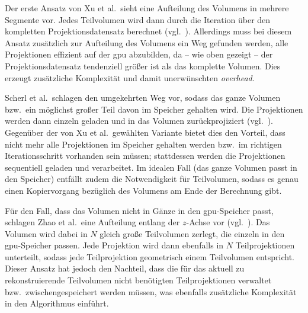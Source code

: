 Der erste Ansatz von Xu et al.\ sieht eine Aufteilung des Volumens in mehrere Segmente vor. Jedes Teilvolumen wird dann
durch die Iteration über den kompletten Projektionsdatensatz berechnet (vgl.~\cite{xumuell}). Allerdings muss bei diesem
Ansatz zusätzlich zur Aufteilung des Volumens ein Weg gefunden werden, alle Projektionen effizient auf der \gls{gpu}
abzubilden, da -- wie oben gezeigt -- der Projektionsdatensatz tendenziell größer ist als das komplette Volumen. Dies
erzeugt zusätzliche Komplexität und damit unerwünschten \textit{overhead}.

Scherl et al.\ schlagen den umgekehrten Weg vor, sodass das ganze Volumen bzw.\ ein möglichst großer Teil davon im
Speicher gehalten wird. Die Projektionen werden dann einzeln geladen und in das Volumen zurückprojiziert
(vgl.~\cite{scherlkeck}). Gegenüber der von Xu et al.\ gewählten Variante bietet dies den Vorteil, dass nicht mehr alle
Projektionen im Speicher gehalten werden bzw.\ im richtigen Iterationsschritt vorhanden sein müssen; stattdessen werden
die Projektionen sequentiell geladen und verarbeitet. Im idealen Fall (das ganze Volumen passt in den Speicher) entfällt
zudem die Notwendigkeit für Teilvolumen, sodass es genau einen Kopiervorgang bezüglich des Volumens am Ende der
Berechnung gibt.

Für den Fall, dass das Volumen nicht in Gänze in den \gls{gpu}-Speicher passt, schlagen Zhao et al.\ eine Aufteilung
entlang der $z$-Achse vor (vgl.~\cite{zhao}). Das Volumen wird dabei in $N$ gleich große Teilvolumen zerlegt, die
einzeln in den \gls{gpu}-Speicher passen. Jede Projektion wird dann ebenfalls in $N$ Teilprojektionen unterteilt, sodass
jede Teilprojektion geometrisch einem Teilvolumen entspricht. Dieser Ansatz hat jedoch den Nachteil, dass die für das
aktuell zu rekonstruierende Teilvolumen nicht benötigten Teilprojektionen verwaltet bzw.\ zwischengespeichert werden
müssen, was ebenfalls zusätzliche Komplexität in den Algorithmus einführt.


